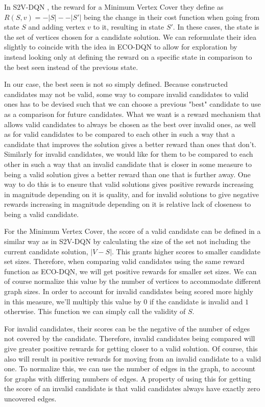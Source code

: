 \documentclass{article}
\begin{document}
In S2V-DQN \cite{s2v-dqn}, the reward for a Minimum Vertex Cover they define as $R(S, v) = -|S| - -|S'|$ being the change in their cost function when going from state $S$ and adding vertex $v$ to it, resulting in state $S'$. In these cases, the state is the set of vertices chosen for a candidate solution. We can reformulate their idea slightly to coincide with the idea in ECO-DQN to allow for exploration by instead looking only at defining the reward on a specific state in comparison to the best seen instead of the previous state.

In our case, the best seen is not so simply defined. Because constructed candidates may not be valid, some way to compare invalid candidates to valid ones has to be devised such that we can choose a previous "best" candidate to use as a comparison for future candidates. What we want is a reward mechanism that allows valid candidates to always be chosen as the best over invalid ones, as well as for valid candidates to be compared to each other in such a way that a candidate that improves the solution gives a better reward than ones that don't. Similarly for invalid candidates, we would like for them to be compared to each other in such a way that an invalid candidate that is closer in some measure to being a valid solution gives a better reward than one that is further away. One way to do this is to ensure that valid solutions gives positive rewards increasing in magnitude depending on it is quality, and for invalid solutions to give negative rewards increasing in magnitude depending on it is relative lack of closeness to being a valid candidate.

For the Minimum Vertex Cover, the score of a valid candidate can be defined in a similar way as in S2V-DQN by calculating the size of the set not including the current candidate solution, $|V - S|$. This grants higher scores to smaller candidate set sizes. Therefore, when comparing valid candidates using the same reward function as ECO-DQN, we will get positive rewards for smaller set sizes. We can of course normalize this value by the number of vertices to accommodate different graph sizes. In order to account for invalid candidates being scored more highly in this measure, we'll multiply this value by $0$ if the candidate is invalid and $1$ otherwise. This function we can simply call the validity of $S$.

For invalid candidates, their scores can be the negative of the number of edges not covered by the candidate. Therefore, invalid candidates being compared will give greater positive rewards for getting closer to a valid solution. Of course, this also will result in positive rewards for moving from an invalid candidate to a valid one. To normalize this, we can use the number of edges in the graph, to account for graphs with differing numbers of edges. A property of using this for getting the score of an invalid candidate is that valid candidates always have exactly zero uncovered edges.
\end{document}
